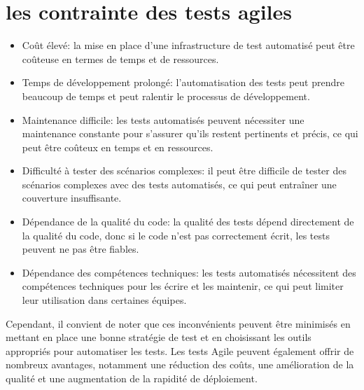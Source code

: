 \section{les contrainte des tests agiles}

\begin{itemize}
\item Coût élevé: 
la mise en place d'une infrastructure de test automatisé peut être coûteuse en termes de temps et de ressources.

\item Temps de développement prolongé: 
l'automatisation des tests peut prendre beaucoup de temps et peut ralentir le processus de développement.

\item Maintenance difficile: 
les tests automatisés peuvent nécessiter une maintenance constante pour s'assurer qu'ils restent pertinents et précis, ce qui peut être coûteux en temps et en ressources.
\item Difficulté à tester des scénarios complexes: 
il peut être difficile de tester des scénarios complexes avec des tests automatisés, ce qui peut entraîner une couverture insuffisante.
\item Dépendance de la qualité du code: 
la qualité des tests dépend directement de la qualité du code, donc si le code n'est pas correctement écrit, les tests peuvent ne pas être fiables.
\item Dépendance des compétences techniques: les tests automatisés nécessitent des compétences techniques pour les écrire et les maintenir, ce qui peut limiter leur utilisation dans certaines équipes.

\end{itemize}
Cependant, il convient de noter que ces inconvénients peuvent être minimisés en mettant en place une bonne stratégie de test et en choisissant les outils appropriés pour automatiser les tests. Les tests Agile peuvent également offrir de nombreux avantages, notamment une réduction des coûts, une amélioration de la qualité et une augmentation de la rapidité de déploiement.



